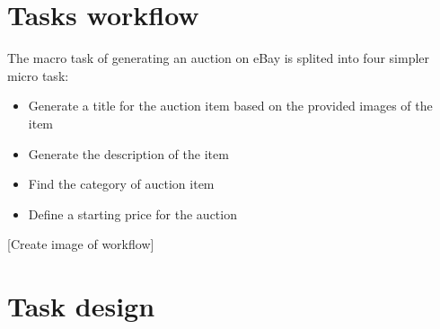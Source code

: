 \section{Tasks workflow}
The macro task of generating an auction on eBay is splited into four simpler micro task:
\begin{itemize}
	\item Generate a title for the auction item based on the provided images of the item
	\item Generate the description of the item
	\item Find the category of auction item
	\item Define a starting price for the auction
\end{itemize}
[Create image of workflow]

\section{Task design}
